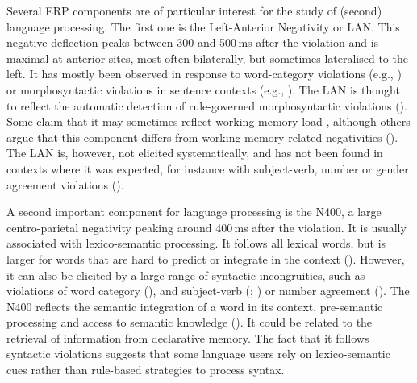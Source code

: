 \documentclass[output=paper,colorlinks,citecolor=brown,modfonts,nonflat]{../langscibook}
\begin{document}
\largerpage
Several ERP components are of particular interest for the study of (second) language processing. The first one is the Left-Anterior Negativity or LAN. This negative deflection peaks between 300 and 500\,ms after the violation and is maximal at anterior sites, most often bilaterally, but sometimes lateralised to the left. It has mostly been observed in response to word-category violations (e.g., \citealt{Weber-FoxNeville1996,IselEtAl2007,BowdenEtAl2013}) or morphosyntactic violations in sentence contexts (e.g., \citealt{OjimaEtAl2005,RossiEtAl2006,ChenEtAl2007,Gillon-DowensEtAl2010,MolinaroEtAl2011,Alemán-BañónEtAl2014}). The LAN is thought to reflect the automatic detection of rule-governed morphosyntactic violations (\citealt{GunterEtAl2000,Morgan-ShortEtAl2015}). Some claim that it may sometimes reflect working memory load \citep{Kaan2007}, although others argue that this component differs from working memory-related negativities (\citealt{Martín-LoechesEtAl2005}). The LAN is, however, not elicited systematically, and has not been found in contexts where it was expected, for instance with subject-verb, number or gender agreement violations (\citealt{BondEtAl2011,FoucartFrenck-Mestre2012}).

A second important component for language processing is the N400, a large centro-parietal negativity peaking around 400\,ms after the violation. It is usually associated with lexico-semantic processing. It follows all lexical words, but is larger for words that are hard to predict or integrate in the context (\citealt{KutasHillyard1980,Federmeier2007,KutasEtAl2011}). However, it can also be elicited by a large range of syntactic incongruities, such as violations of word category (\citealt{Weber-FoxNeville1996,GuoEtAl2009,Kotz2009}), and subject-verb (\citealt{XueEtAl2013}; \citealt{TannerHell2014,TannerEtAl2014}) or number agreement (\citealt{OsterhoutEtAl2006,BatterinkNeville2013}). The N400 reflects the semantic integration of a word in its context, pre-semantic processing and access to semantic knowledge (\citealt{Morgan-ShortEtAl2015,Isel2017}). It could be related to the retrieval of information from declarative memory. The fact that it follows syntactic violations suggests that some language users rely on lexico-semantic cues rather than rule-based strategies to process syntax.
\end{document}
